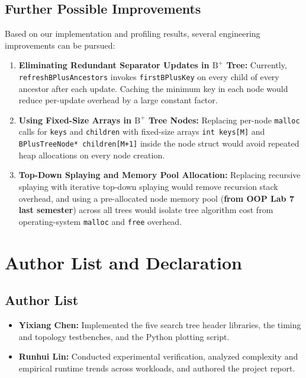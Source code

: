 \documentclass[10pt, a4paper]{article}
\newcommand{\code}[1]{\texttt{\color{primary!90!black}#1}}
\begin{document}
\subsection{Further Possible Improvements}
Based on our implementation and profiling results, several engineering improvements can be pursued:
\begin{enumerate}[label=\textbf{\color{primary}\arabic*.}]
  \item \textbf{Eliminating Redundant Separator Updates in $\text{B}^+$ Tree:} Currently, \code{refreshBPlusAncestors} invokes \code{firstBPlusKey} on every child of every ancestor after each update. Caching the minimum key in each node would reduce per-update overhead by a large constant factor.
  \item \textbf{Using Fixed-Size Arrays in $\text{B}^+$ Tree Nodes:} Replacing per-node \code{malloc} calls for \code{keys} and \code{children} with fixed-size arrays \code{int keys[M]} and \code{BPlusTreeNode* children[M+1]} inside the node struct would avoid repeated heap allocations on every node creation.
  \item \textbf{Top-Down Splaying and Memory Pool Allocation:} Replacing recursive splaying with iterative top-down splaying would remove recursion stack overhead, and using a pre-allocated node memory pool (\textbf{from OOP Lab 7 last semester}) across all trees would isolate tree algorithm cost from operating-system \code{malloc} and \code{free} overhead.
\end{enumerate}

\clearpage

\section*{Author List and Declaration}

\subsection*{Author List}
\begin{itemize}
  \item \textbf{\color{primary}Yixiang Chen:} Implemented the five search tree header libraries, the timing and topology testbenches, and the Python plotting script.
  \item \textbf{\color{primary}Runhui Lin:} Conducted experimental verification, analyzed complexity and empirical runtime trends across workloads, and authored the project report.
\end{itemize}
\end{document}
